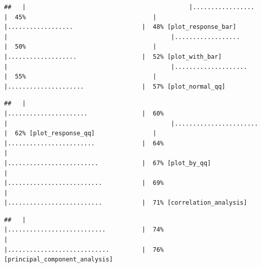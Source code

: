 \documentclass[
]{article}
\begin{document}
\begin{verbatim}
##   |                                             |.................                    |  45%                                   |                                             |..................                   |  48% [plot_response_bar]               |                                             |..................                   |  50%                                   |                                             |...................                  |  52% [plot_with_bar]                   |                                             |....................                 |  55%                                   |                                             |.....................                |  57% [plot_normal_qq]
\end{verbatim}

\begin{verbatim}
##   |                                             |......................               |  60%                                   |                                             |.......................              |  62% [plot_response_qq]                |                                             |........................             |  64%                                   |                                             |.........................            |  67% [plot_by_qq]                      |                                             |..........................           |  69%                                   |                                             |..........................           |  71% [correlation_analysis]
\end{verbatim}

\begin{verbatim}
##   |                                             |...........................          |  74%                                   |                                             |............................         |  76% [principal_component_analysis]
\end{verbatim}
\end{document}
